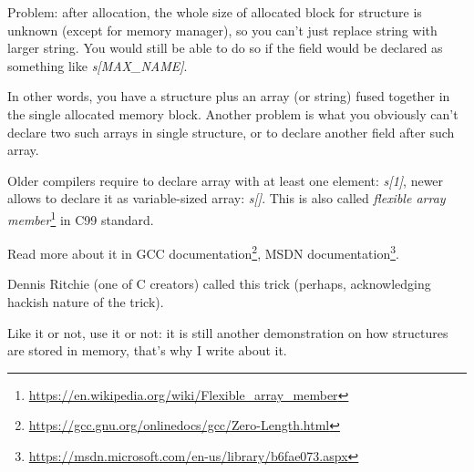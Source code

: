 Problem: after allocation, the whole size of allocated block for structure is unknown (except for memory manager),
so you can't just replace string with larger string.
You would still be able to do so if the field would be declared as something like \emph{s[MAX\_NAME]}.

In other words, you have a structure plus an array (or string) fused together in the single allocated memory block.
Another problem is what you obviously can't declare two such arrays in single structure, or to declare another field
after such array.

Older compilers require to declare array with at least one element: \emph{s[1]}, newer allows to declare it as variable-sized
array: \emph{s[]}.
This is also called \emph{flexible array member}\footnote{\url{https://en.wikipedia.org/wiki/Flexible_array_member}}
in C99 standard.

Read more about it in
GCC documentation\footnote{\url{https://gcc.gnu.org/onlinedocs/gcc/Zero-Length.html}},
MSDN documentation\footnote{\url{https://msdn.microsoft.com/en-us/library/b6fae073.aspx}}.

Dennis Ritchie (one of C creators) called this trick  
(perhaps, acknowledging hackish nature of the trick).

Like it or not, use it or not:
it is still another demonstration on how structures are stored in memory, that's why I write about it.

